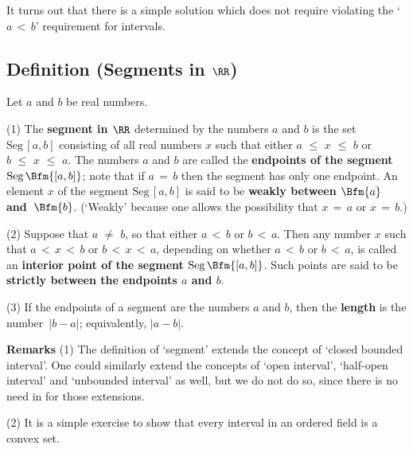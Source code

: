         It turns out that there is a simple solution which does not require violating the `$a\,<\,b$' requirement for intervals.

\V

            \subsection{\small{\bf Definition} (Segments in ${\RR}$)}
            \label{DefB20.140}

\V

        Let $a$ and $b$ be real numbers.

\V

        (1) The {\bf segment in ${\RR}$} determined by the numbers $a$ and $b$ is the set $\mbox{Seg}\,[a,b]$
    consisting of all real numbers $x$ such that either $a\,\,{\leq}\,\,x\,\,{\leq}\,\,b$ or $b\,\,{\leq}\,\,x\,\,{\leq}\,\,a$.
    The numbers $a$ and $b$ are called the {\bf endpoints of the segment $\mbox{Seg}\,\Bfm{[a,b]}$};
    note that if $a \,=\, b$ then the segment has only one endpoint. An element $x$ of the segment
    $\mbox{Seg}\,[a,b]$ is said to be {\bf weakly between $\Bfm{a}$ and~$\Bfm{b}$}.
    (`Weakly' because one allows the possibility that $x \,=\, a$ or $x \,=\, b$.)

\V

        (2) Suppose that $a \,\,{\neq}\,\, b$, so that either $a\,<\,b$ or $b\,<\,a$.
    Then any number $x$ such that $a\,<\,x\,<\,b$ or $b\,<\,x\,<\,a$, depending on whether $a\,<\,b$ or $b\,<\,a$,
    is called an {\bf interior point of the segment $\mbox{Seg}\,\Bfm{[a,b]}$}. Such points are said to be
    {\bf strictly between the endpoints $a$ and $b$}.

\V

        (3) If the endpoints of a segment are the numbers $a$ and $b$, then the {\bf length}
    is the number~$|b-a|$; equivalently, $|a-b|$.

\VV

        {\bf Remarks} (1) The definition of `segment' extends the concept of `closed bounded interval'.
    One could similarly extend the concepts of `open interval', `half-open interval' and `unbounded interval' as well,
    but we do not do so, since there is no need in {\ThisText} for those extensions.

\V

        (2) It is a simple exercise to show that every interval in an ordered field is a convex set.

